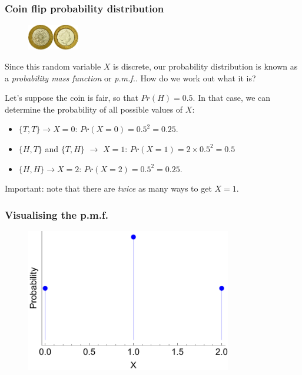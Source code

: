 \documentclass{beamer}
\begin{document}
	\begin{frame}
		\frametitle{Coin flip probability distribution}
		
		\begin{figure}[ht]
			\includegraphics[width=0.2\textwidth]{./figures/coins.jpeg}
		\end{figure}
		
		Since this random variable $X$ is discrete, our probability distribution is known as a \textit{probability mass function} or \textit{p.m.f.}. How do we work out what it is?
		
		\vspace{0.5cm}
		
		Let's suppose the coin is fair, so that $Pr(H) = 0.5$. In that case, we can determine the probability of all possible values of $X$:
		
		\begin{itemize}
			\item $\{T,T\}\rightarrow X=0$: $Pr(X=0) = 0.5^2 = 0.25$.
			\item $\{H,T\}$ and $\{T,H\}$ $\rightarrow$ $X=1$: $Pr(X = 1) = 2 \times 0.5^2 = 0.5$
			\item $\{H,H\} \rightarrow X=2$: $Pr(X=2) = 0.5^2 = 0.25$.
		\end{itemize}
		
		Important: note that there are \textit{twice} as many ways to get $X=1$.
		
	\end{frame}
	
	\begin{frame}
		\frametitle{Visualising the p.m.f.}
		
		\begin{figure}[ht]
			\includegraphics[width=0.8\textwidth]{./figures/binomial.pdf}
		\end{figure}
		
	\end{frame}
	
\end{document}
